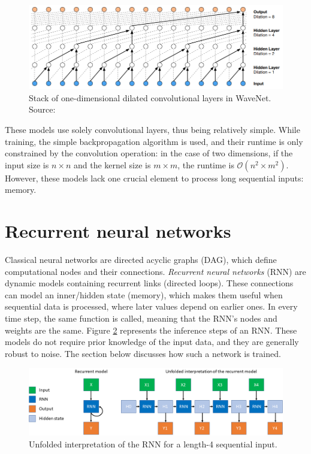\begin{figure}[H]
 \centerline{\includegraphics[width=1.0\columnwidth]{.//Figure/Sequential/WaveNet_dilation.png}}
 \caption{Stack of one-dimensional dilated convolutional layers in WaveNet. Source: \cite{WaveNet}}
 \label{fig:WaveNet_dilation}
\end{figure}

These models use solely convolutional layers, thus being relatively simple. While training, the simple backpropagation algorithm is used, and their runtime is only constrained by the convolution operation: in the case of two dimensions, if the input size is ${n}\times{n}$ and the kernel size is ${m}\times{m}$, the runtime is $\mathcal{O}({n^2}\times{m^2})$. However, these models lack one crucial element to process long sequential inputs: memory.

\section{Recurrent neural networks}

Classical neural networks are directed acyclic graphs (DAG), which define computational nodes and their connections. \textit{Recurrent neural networks} (RNN) are dynamic models containing recurrent links (directed loops). These connections can model an inner/hidden state (memory), which makes them useful when sequential data is processed, where later values depend on earlier ones. In every time step, the same function is called, meaning that the RNN's nodes and weights are the same. Figure \ref{fig:RNN} represents the inference steps of an RNN. These models do not require prior knowledge of the input data, and they are generally robust to noise\cite{CTC}. The section below discusses how such a network is trained.

\begin{figure}[htb]
 \centerline{\includegraphics[width=1.0\columnwidth]{.//Figure/Sequential/RNN.png}}
 \caption{Unfolded interpretation of the RNN for a length-4 sequential input.}
 \label{fig:RNN}
\end{figure}

